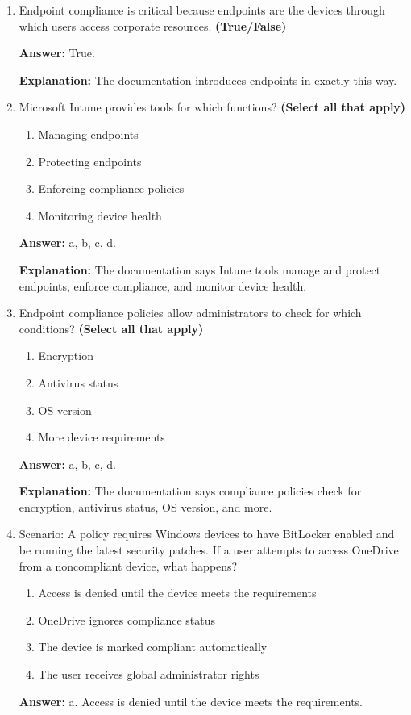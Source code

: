 \documentclass[10pt]{article}
\begin{document}
\begin{enumerate}[leftmargin=*]
\textbf{Explanation:} Phase 3 is specifically titled Enforce endpoint compliance.

\item Endpoint compliance is critical because endpoints are the devices through which users access corporate resources. \textbf{(True/False)}

\textbf{Answer:} True.

\textbf{Explanation:} The documentation introduces endpoints in exactly this way.

\item Microsoft Intune provides tools for which functions? \textbf{(Select all that apply)}
\begin{enumerate}[label=\alph*., leftmargin=1.5em]
\item Managing endpoints
\item Protecting endpoints
\item Enforcing compliance policies
\item Monitoring device health
\end{enumerate}
\textbf{Answer:} a, b, c, d.

\textbf{Explanation:} The documentation says Intune tools manage and protect endpoints, enforce compliance, and monitor device health.

\item Endpoint compliance policies allow administrators to check for which conditions? \textbf{(Select all that apply)}
\begin{enumerate}[label=\alph*., leftmargin=1.5em]
\item Encryption
\item Antivirus status
\item OS version
\item More device requirements
\end{enumerate}
\textbf{Answer:} a, b, c, d.

\textbf{Explanation:} The documentation says compliance policies check for encryption, antivirus status, OS version, and more.

\item Scenario: A policy requires Windows devices to have BitLocker enabled and be running the latest security patches. If a user attempts to access OneDrive from a noncompliant device, what happens?
\begin{enumerate}[label=\alph*., leftmargin=1.5em]
\item Access is denied until the device meets the requirements
\item OneDrive ignores compliance status
\item The device is marked compliant automatically
\item The user receives global administrator rights
\end{enumerate}
\textbf{Answer:} a. Access is denied until the device meets the requirements.


\end{enumerate}
\end{document}

